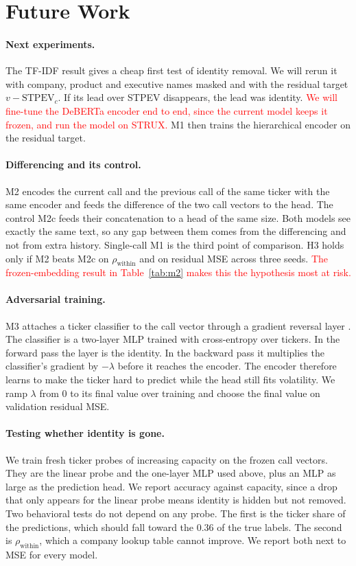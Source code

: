 \documentclass{article}
\newcommand{\new}[1]{\textcolor{red}{#1}}
\begin{document}
\section{Future Work}
\label{sec:plan}

\paragraph{Next experiments.}
The TF-IDF result gives a cheap first test of identity removal. We will rerun it with company, product and executive names masked and with the residual target $v-\mathrm{STPEV}_c$. If its lead over STPEV disappears, the lead was identity. \new{We will fine-tune the DeBERTa encoder end to end, since the current model keeps it frozen, and run the model on STRUX.} M1 then trains the hierarchical encoder on the residual target.

\paragraph{Differencing and its control.}
M2 encodes the current call and the previous call of the same ticker with the same encoder and feeds the difference of the two call vectors to the head. The control M2c feeds their concatenation to a head of the same size. Both models see exactly the same text, so any gap between them comes from the differencing and not from extra history. Single-call M1 is the third point of comparison. H3 holds only if M2 beats M2c on $\rho_{\text{within}}$ and on residual MSE across three seeds. \new{The frozen-embedding result in Table~\ref{tab:m2} makes this the hypothesis most at risk.}

\paragraph{Adversarial training.}
M3 attaches a ticker classifier to the call vector through a gradient reversal layer \cite{ganin2016dann}. The classifier is a two-layer MLP trained with cross-entropy over tickers. In the forward pass the layer is the identity. In the backward pass it multiplies the classifier's gradient by $-\lambda$ before it reaches the encoder. The encoder therefore learns to make the ticker hard to predict while the head still fits volatility. We ramp $\lambda$ from 0 to its final value over training and choose the final value on validation residual MSE.

\paragraph{Testing whether identity is gone.}
We train fresh ticker probes of increasing capacity on the frozen call vectors. They are the linear probe and the one-layer MLP used above, plus an MLP as large as the prediction head. We report accuracy against capacity, since a drop that only appears for the linear probe means identity is hidden but not removed. Two behavioral tests do not depend on any probe. The first is the ticker share of the predictions, which should fall toward the 0.36 of the true labels. The second is $\rho_{\text{within}}$, which a company lookup table cannot improve. We report both next to MSE for every model.
\end{document}
